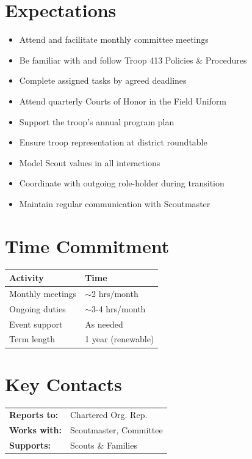 \documentclass[10pt, letterpaper]{article}
\begin{document}
\begin{minipage}[t]{0.48\linewidth}
\raggedright

\section{Expectations}
\begin{itemize}
  \item Attend and facilitate monthly committee meetings
  \item Be familiar with and follow Troop 413 Policies \& Procedures
  \item Complete assigned tasks by agreed deadlines
  \item Attend quarterly Courts of Honor in the Field Uniform
  \item Support the troop's annual program plan
  \item Ensure troop representation at district roundtable
  \item Model Scout values in all interactions
  \item Coordinate with outgoing role-holder during transition
  \item Maintain regular communication with Scoutmaster
\end{itemize}

\section{Time Commitment}
\begin{tabular}{@{}p{3.0cm} p{3.8cm}@{}}
  \toprule
  \textbf{Activity} & \textbf{Time} \\
  \midrule
  Monthly meetings  & $\sim$2 hrs/month \\
  Ongoing duties    & $\sim$3-4 hrs/month \\
  Event support     & As needed \\
  Term length       & 1 year (renewable) \\
  \bottomrule
\end{tabular}

\vspace{1em}

\section{Key Contacts}
\begin{tabular}{@{}p{2.6cm} >{\raggedright\arraybackslash}p{4.2cm}@{}}
  \textbf{Reports to:}  & Chartered Org. Rep. \\
  \textbf{Works with:}  & Scoutmaster, Committee \\
  \textbf{Supports:}    & Scouts \& Families \\
\end{tabular}

\end{minipage}
\end{document}
